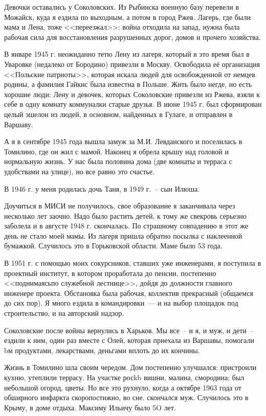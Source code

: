 Девочки  оставались  у  Соколовских.  Из  Рыбинска  военную  базу перевели  в 
Можайск, куда я ездила по выходным, а потом в город Ржев. Лагерь, где были мама 
и Лена, тоже  <<переезжал>>: война  отходила  на запад, нужна была рабочая сила для 
восстановления  разрушенных дорог,  домов  и  прочего  хозяйства.

В январе  1945 г.  неожиданно  тетю  Лену  из  лагеря,  который  в это  время был 
в Уваровке (недалеко от Бородино) привезли  в Москву.  Освободила её организация 
<<Польские патриоты>>, которая искала людей для освобожденной от немцев родины, 
а фамилия  Гайкис  была известна  в  Польше. Жить  было негде, но есть  хорошие 
люди: Лену и девочек, которых  Соколовские привезли  из Ржева, взяли  к  себе  в 
одну комнату коммуналки  старые друзья.  В июне  1945 г. был сформирован  целый 
эшелон  из  людей, в основном, найденных в Гулаге, и отправлен в Варшаву.

А  я в сентябре  1945 года  вышла  замуж  за  М.И. Левданского  и  поселилась  в 
Томилино, где он жил с мамой. Наконец я обрела крышу над головой и нормальную 
жизнь. У нас  была половина дома (две комнаты и терраса  с  удобствами на улице), 
но все равно  это счастье.

В  1946 г. у меня родилась дочь Таня,  в  1949 г.~-- сын Илюша.

Доучиться  в  МИСИ  не  получилось,  свое  образование  я  заканчивала  через 
несколько  лет  заочно.  Надо  было  растить  детей,  к тому  же  свекровь  серьезно 
заболела и в августе  1948 г. скончалась. По страшному совпадению  в этот  же  день 
не  стало  моей  мамы.  Из  лагеря пришла  обратно посылка с наклеенной бумажкой. 
Случилось  это в Горьковской области. Маме было 53 года.

В  1951  г. с помощью моих сокурсников, ставших уже инженерами, я  поступила 
в  проектный институт, в котором проработала до пенсии, постепенно  <<поднимаясьпо  служебной  лестнице>>,  дойдя  до  должности  главного  инженере  проекта.
Обстановка  была рабочая, коллектив прекрасный (общаемся до сих пор).  Я  много 
ездила в командировки~--- и  на выбор площадок под строительство, и  на  авторский 
надзор.

Соколовские  после  войны  вернулись  в Харьков. Мы все~-- и я, и муж, и  дети~--
ездили к ним, один раз вместе с Олей,  которая приехала из Варшавы, помогали  bм 
продуктами, лекарствами, деньгами вплоть до их кончины.

Жизнь в Томилино шла своим чередом. Дом постепенно улучшался:  пристроили 
кухню,  утеплили  террасу. На  участке  росkb  вишни,  малина, смородина; был 
небольшой  огород,  цветы.  Но все  это  рухнуло,  когда  а  октябре  1963 года  от 
обширного  инфаркта  скоропостижно,  во сне. скончался  муж.  Случилось  это  в 
Крыму, в доме отдыха. Максиму Ильичу было 5O лет.

